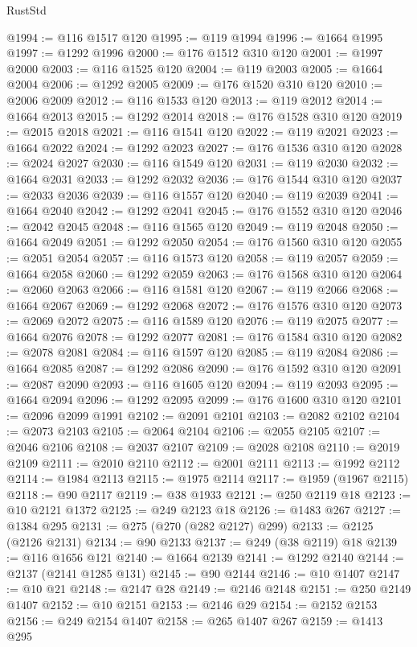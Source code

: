 \begin{lexlean}{RustStd}
\begin{coremodule}
@1994 := @116 @1517 @120
@1995 := @119 @1994
@1996 := @1664 @1995
@1997 := @1292 @1996
@2000 := @176 @1512 @310 @120
@2001 := @1997 @2000
@2003 := @116 @1525 @120
@2004 := @119 @2003
@2005 := @1664 @2004
@2006 := @1292 @2005
@2009 := @176 @1520 @310 @120
@2010 := @2006 @2009
@2012 := @116 @1533 @120
@2013 := @119 @2012
@2014 := @1664 @2013
@2015 := @1292 @2014
@2018 := @176 @1528 @310 @120
@2019 := @2015 @2018
@2021 := @116 @1541 @120
@2022 := @119 @2021
@2023 := @1664 @2022
@2024 := @1292 @2023
@2027 := @176 @1536 @310 @120
@2028 := @2024 @2027
@2030 := @116 @1549 @120
@2031 := @119 @2030
@2032 := @1664 @2031
@2033 := @1292 @2032
@2036 := @176 @1544 @310 @120
@2037 := @2033 @2036
@2039 := @116 @1557 @120
@2040 := @119 @2039
@2041 := @1664 @2040
@2042 := @1292 @2041
@2045 := @176 @1552 @310 @120
@2046 := @2042 @2045
@2048 := @116 @1565 @120
@2049 := @119 @2048
@2050 := @1664 @2049
@2051 := @1292 @2050
@2054 := @176 @1560 @310 @120
@2055 := @2051 @2054
@2057 := @116 @1573 @120
@2058 := @119 @2057
@2059 := @1664 @2058
@2060 := @1292 @2059
@2063 := @176 @1568 @310 @120
@2064 := @2060 @2063
@2066 := @116 @1581 @120
@2067 := @119 @2066
@2068 := @1664 @2067
@2069 := @1292 @2068
@2072 := @176 @1576 @310 @120
@2073 := @2069 @2072
@2075 := @116 @1589 @120
@2076 := @119 @2075
@2077 := @1664 @2076
@2078 := @1292 @2077
@2081 := @176 @1584 @310 @120
@2082 := @2078 @2081
@2084 := @116 @1597 @120
@2085 := @119 @2084
@2086 := @1664 @2085
@2087 := @1292 @2086
@2090 := @176 @1592 @310 @120
@2091 := @2087 @2090
@2093 := @116 @1605 @120
@2094 := @119 @2093
@2095 := @1664 @2094
@2096 := @1292 @2095
@2099 := @176 @1600 @310 @120
@2101 := @2096 @2099 @1991
@2102 := @2091 @2101
@2103 := @2082 @2102
@2104 := @2073 @2103
@2105 := @2064 @2104
@2106 := @2055 @2105
@2107 := @2046 @2106
@2108 := @2037 @2107
@2109 := @2028 @2108
@2110 := @2019 @2109
@2111 := @2010 @2110
@2112 := @2001 @2111
@2113 := @1992 @2112
@2114 := @1984 @2113
@2115 := @1975 @2114
@2117 := @1959 (@1967 @2115)
@2118 := @90 @2117
@2119 := @38 @1933
@2121 := @250 @2119 @18
@2123 := @10 @2121 @1372
@2125 := @249 @2123 @18
@2126 := @1483 @267
@2127 := @1384 @295
@2131 := @275 (@270 (@282 @2127) @299)
@2133 := @2125 (@2126 @2131)
@2134 := @90 @2133
@2137 := @249 (@38 @2119) @18
@2139 := @116 @1656 @121
@2140 := @1664 @2139
@2141 := @1292 @2140
@2144 := @2137 (@2141 @1285 @131)
@2145 := @90 @2144
@2146 := @10 @1407
@2147 := @10 @21
@2148 := @2147 @28
@2149 := @2146 @2148
@2151 := @250 @2149 @1407
@2152 := @10 @2151
@2153 := @2146 @29
@2154 := @2152 @2153
@2156 := @249 @2154 @1407
@2158 := @265 @1407 @267
@2159 := @1413 @295

\end{coremodule}
\end{lexlean}
